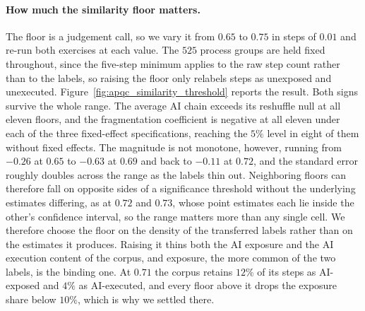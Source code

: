 \paragraph{How much the similarity floor matters.}
The floor is a judgement call, so we vary it from $0.65$ to $0.75$ in steps of $0.01$ and re-run both exercises at each value.
The $525$ process groups are held fixed throughout, since the five-step minimum applies to the raw step count rather than to the labels, so raising the floor only relabels steps as unexposed and unexecuted.
Figure~\ref{fig:apqc_similarity_threshold} reports the result.
Both signs survive the whole range.
The average AI chain exceeds its reshuffle null at all eleven floors, and the fragmentation coefficient is negative at all eleven under each of the three fixed-effect specifications, reaching the $5\%$ level in eight of them without fixed effects.
The magnitude is not monotone, however, running from $-0.26$ at $0.65$ to $-0.63$ at $0.69$ and back to $-0.11$ at $0.72$, and the standard error roughly doubles across the range as the labels thin out.
Neighboring floors can therefore fall on opposite sides of a significance threshold without the underlying estimates differing, as at $0.72$ and $0.73$, whose point estimates each lie inside the other's confidence interval, so the range matters more than any single cell.
We therefore choose the floor on the density of the transferred labels rather than on the estimates it produces.
Raising it thins both the AI exposure and the AI execution content of the corpus, and exposure, the more common of the two labels, is the binding one.
At $0.71$ the corpus retains $12\%$ of its steps as AI-exposed and $4\%$ as AI-executed, and every floor above it drops the exposure share below $10\%$, which is why we settled there.
